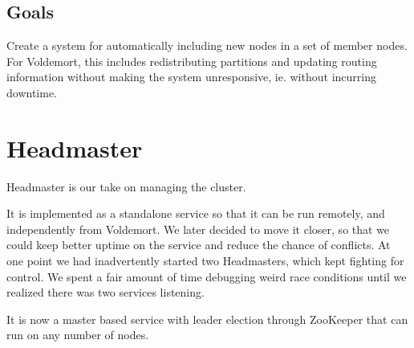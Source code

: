 \subsection{Goals}
Create a system for automatically including new nodes in a set of member nodes.
For Voldemort, this includes redistributing partitions and updating routing information without making the system unresponsive, ie. without incurring downtime.

\subsection{}

\section{Headmaster}
Headmaster is our take on managing the cluster.

It is implemented as a standalone service so that it can be run remotely, and independently from Voldemort.
We later decided to move it closer, so that we could keep better uptime on the service and reduce the chance of conflicts.
At one point we had inadvertently started two Headmasters, which kept fighting for control.
We spent a fair amount of time debugging weird race conditions until we realized there was two services listening.

It is now a master based service with leader election through ZooKeeper that can run on any number of nodes.

\section{}
